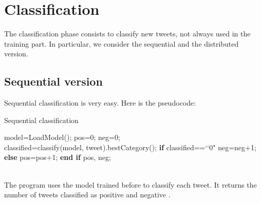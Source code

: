 \documentclass[10pt,twocolumn,letterpaper]{article}
\begin{document}
\section{Classification}
The classification phase consists to classify new tweets, not always used in the training part. In particular, we consider the sequential and the distributed version.
\subsection{Sequential version}
Sequential classification is very easy. Here is the pseudocode:\\
\begin{algorithm}
\label{Sequential classification}
\caption{Sequential classification}
\begin{algorithmic}
\State model=LoadModel();
\State pos=0;
\State neg=0;
    	 \do \\
		\State classified=classify(model, tweet).bestCategory();
		\State \textbf{if}  classified==\lq\lq0"
			\State\hspace{\algorithmicindent} neg=neg+1;
		\State \textbf{else} 
		\State\hspace{\algorithmicindent}pos=pos+1;
		\State \textbf{end if} 
	\EndFor 	
\State \Return pos, neg;
\end{algorithmic}
\end{algorithm} \\
The program uses the model trained before to classify each tweet. It returns the number of tweets classified as positive and negative .
\end{document}

